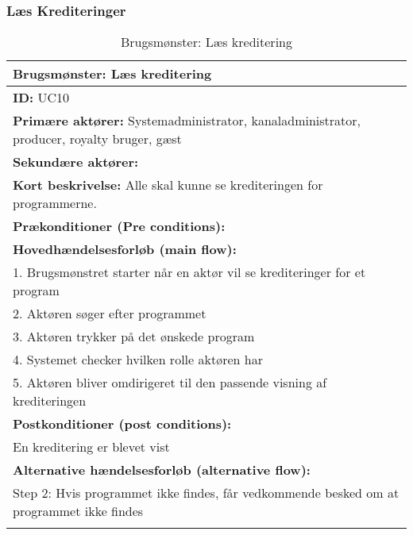 \subsubsection{Læs Krediteringer}
\begin{longtable}[h]{|p{16cm}|}
    \hline
    \textbf{Brugsmønster:}  Læs kreditering \\ 
    \hline
	\textbf{ID:} UC10 \\ 
	\hline
	\textbf{Primære aktører:} Systemadministrator, kanaladministrator, producer, royalty bruger, gæst \\ \hline
	\textbf{Sekundære aktører:} \\ \hline
	\textbf{Kort beskrivelse:} Alle skal kunne se krediteringen for programmerne. \\ \hline
	\textbf{Prækonditioner (Pre conditions):} \\ \hline
\textbf{Hovedhændelsesforløb (main flow):} \\
1. Brugsmønstret starter når en aktør vil se krediteringer for et program \\
2. Aktøren søger efter programmet \\
3. Aktøren trykker på det ønskede program \\
4. Systemet checker hvilken rolle aktøren har \\
5. Aktøren bliver omdirigeret til den passende visning af krediteringen \\ \hline
    \textbf{Postkonditioner (post conditions):} \\
    En kreditering er blevet vist \\ \hline

	\textbf{Alternative hændelsesforløb (alternative flow):} \\
Step 2: Hvis programmet ikke findes, får vedkommende besked om at programmet ikke findes \\ 
\hline
\caption{Brugsmønster: Læs kreditering}
\label{table:read_credits}
\end{longtable}

